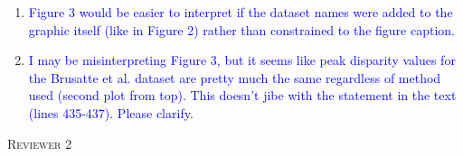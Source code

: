 \documentclass[12pt,letterpaper]{article}
\renewcommand{\section}[1]{%
\bigskip
\begin{center}
\begin{Large}
\normalfont\scshape #1
\medskip
\end{Large}
\end{center}}
\begin{document}
\begin{enumerate}



\item{\textcolor{blue}{Figure 3 would be easier to interpret if the dataset names were added to the graphic itself (like in Figure 2) rather than constrained to the figure caption.}}



\item{\textcolor{blue}{I may be misinterpreting Figure 3, but it seems like peak disparity values for the Brusatte et al. dataset are pretty much the same regardless of method used (second plot from top). This doesn’t jibe with the statement in the text (lines 435-437). Please clarify.}}

\end{enumerate}





%
%





\section{Reviewer 2}
\end{document}
